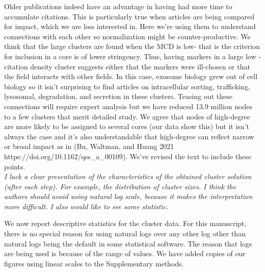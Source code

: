 \documentclass[11pt, oneside]{article}   	%
\begin{document}
Older publications indeed have an advantage in having had more time to accumulate citations. This is particularly true when articles are being compared for impact, which we are less interested in. Here we're using them to understand connections with each other so normalization might be counter-productive. We think that the large clusters are found when the MCD is low- that is the criterion for inclusion in a core is of lower stringency. Thus, having markers in a large low -citation density cluster suggests either that the markers were ill-chosen or that the field interacts with other fields. In this case, exosome biology grew out of cell biology so it isn't surprising to find articles on intracellular sorting, trafficking, lysosomal, degradation, and secretion in these clusters. Teasing out these connections will require expert analysis but we have reduced 13.9 million nodes to a few clusters that merit detailed study. We agree that nodes of high-degree are more likely to be assigned to several cores (our data show this) but it isn't always the case and it's also understandable that high-degree can reflect narrow or broad impact as in (Bu, Waltman, and Huang 2021 https://doi.org/10.1162/qss\_a\_00109). We've revised the text to include these points. \\

\emph{I lack a clear presentation of the characteristics of the obtained cluster solution (after each step). For example, the distribution of cluster sizes. I think the authors should avoid using natural log scale, because it makes the interpretation more difficult. I also would like to see some statistic.}

We now report descriptive statistics for the cluster data. For this manuscript, there is no special reason for using natural logs over any other log other than natural logs being the default in some statistical software. The reason that logs are being used is because of the range of values. We have added copies of our figures using linear scales to the Supplementary methods. 

\vspace{4 mm}
\end{document}

